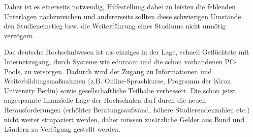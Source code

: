 Daher ist es einerseits notwendig, Hilfestellung dabei zu leisten die fehlenden
Unterlagen nachzureichen und andererseits sollten diese schwierigen Umstände
den Studieneinstieg bzw. die Weiterführung eines Studiums nicht unnötig
verzögern.

Das deutsche Hochschulwesen ist als einziges in der Lage, schnell Geflüchtete
mit Internetzugang, durch Systeme wie eduroam und die schon vorhandenen
PC-Pools, zu versorgen. Dadurch wird der Zugang zu Informationen  und
Weiterbildungsmaßnahmen (z.B. Online-Sprachkurse, Programm der Kiron University
Berlin) sowie gesellschaftliche Teilhabe verbessert. Die schon jetzt
angespannte finanzielle Lage der Hochschulen darf durch die neuen
Herausforderungen (erhöhter Beratungsaufwand, höhere Studierendenzahlen etc.)
nicht weiter strapaziert werden, daher müssen zusätzliche Gelder aus Bund und
Ländern zu Verfügung gestellt werden.
